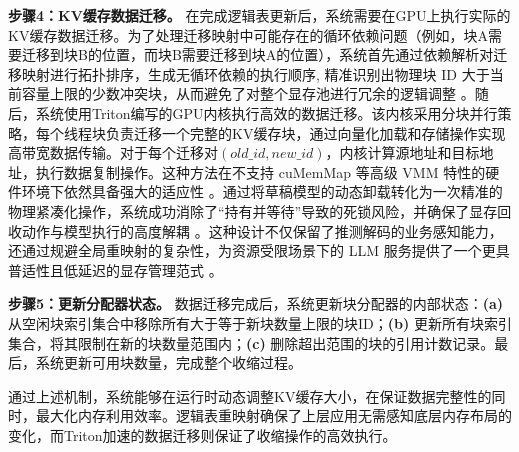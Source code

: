     \textbf{步骤4：KV缓存数据迁移。} 在完成逻辑表更新后，系统需要在GPU上执行实际的KV缓存数据迁移。为了处理迁移映射中可能存在的循环依赖问题（例如，块A需要迁移到块B的位置，而块B需要迁移到块A的位置），系统首先通过依赖解析对迁移映射进行拓扑排序，生成无循环依赖的执行顺序, 精准识别出物理块 ID 大于当前容量上限的少数冲突块，从而避免了对整个显存池进行冗余的逻辑调整 。随后，系统使用Triton编写的GPU内核执行高效的数据迁移。该内核采用分块并行策略，每个线程块负责迁移一个完整的KV缓存块，通过向量化加载和存储操作实现高带宽数据传输。对于每个迁移对$(old\_id, new\_id)$，内核计算源地址和目标地址，执行数据复制操作。这种方法在不支持 cuMemMap 等高级 VMM 特性的硬件环境下依然具备强大的适应性 。通过将草稿模型的动态卸载转化为一次精准的物理紧凑化操作，系统成功消除了“持有并等待”导致的死锁风险，并确保了显存回收动作与模型执行的高度解耦 。这种设计不仅保留了推测解码的业务感知能力，还通过规避全局重映射的复杂性，为资源受限场景下的 LLM 服务提供了一个更具普适性且低延迟的显存管理范式 。

    
    \textbf{步骤5：更新分配器状态。} 数据迁移完成后，系统更新块分配器的内部状态：\textbf{(a)} 从空闲块索引集合中移除所有大于等于新块数量上限的块ID；\textbf{(b)} 更新所有块索引集合，将其限制在新的块数量范围内；\textbf{(c)} 删除超出范围的块的引用计数记录。最后，系统更新可用块数量，完成整个收缩过程。
    
    通过上述机制，系统能够在运行时动态调整KV缓存大小，在保证数据完整性的同时，最大化内存利用效率。逻辑表重映射确保了上层应用无需感知底层内存布局的变化，而Triton加速的数据迁移则保证了收缩操作的高效执行。